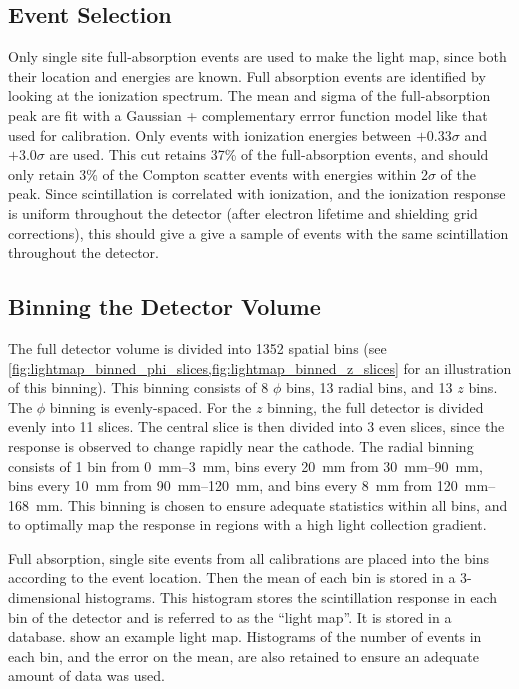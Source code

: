 \documentclass[herrin-thesis.tex]{subfiles}
\begin{document}
\subsection{Event Selection}
Only single site full-absorption events are used to make the light map, since both their location and energies are known. Full absorption events are identified by looking at the ionization spectrum. The mean and sigma of the full-absorption peak are fit with a Gaussian + complementary errror function model like that used for calibration. Only events with ionization energies between \(+0.33\sigma\) and \(+3.0\sigma\) are used. This cut retains 37\% of the full-absorption events, and should only retain 3\% of the Compton scatter events with energies within 2\(\sigma\) of the peak. Since scintillation is correlated with ionization, and the ionization response is uniform throughout the detector (after electron lifetime and shielding grid corrections), this should give a give a sample of events with the same scintillation throughout the detector.

\subsection{Binning the Detector Volume}

The full detector volume is divided into 1352 spatial bins (see \cref{fig:lightmap_binned_phi_slices,fig:lightmap_binned_z_slices} for an illustration of this binning). This binning consists of 8 \(\phi\) bins, 13 radial bins, and 13 \(z\) bins. The \(\phi\) binning is evenly-spaced. For the \(z\) binning, the full detector is divided evenly into 11 slices. The central slice is then divided into 3 even slices, since the response is observed to change rapidly near the cathode. The radial binning consists of 1 bin from \SIrange{0}{3}{\mm}, bins every \SI{20}{mm} from \SIrange{30}{90}{\mm}, bins every \SI{10}{\mm} from \SIrange{90}{120}{\mm}, and bins every \SI{8}{mm} from \SIrange{120}{168}{\mm}. This binning is chosen to ensure adequate statistics within all bins, and to optimally map the response in regions with a high light collection gradient.

Full absorption, single site events from all calibrations are placed into the bins according to the event location. Then the mean of each bin is stored in a 3-dimensional histograms. This histogram stores the scintillation response in each bin of the detector and is referred to as the ``light map''. It is stored in a database.  show an example light map. Histograms of the number of events in each bin, and the error on the mean, are also retained to ensure an adequate amount of data was used.
\end{document}
